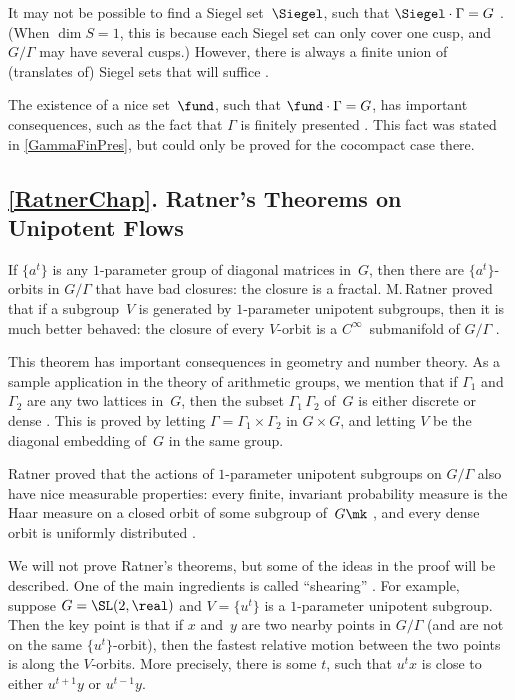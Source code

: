 It may not be possible to find a Siegel set~$\Siegel$, such that $\Siegel \cdot \Gamma = G$ . (When $\dim S = 1$, this is because each Siegel set can only cover one cusp, and $G/\Gamma$ may have several cusps.) However, there is always a finite union of (translates of) Siegel sets that will suffice .

\smallbreak

The existence of a nice set~$\fund$, such that $\fund \cdot \Gamma = G$, has  important consequences, such as the fact that $\Gamma$ is finitely presented . This fact was stated in \cref{GammaFinPres}, but could only be proved for the cocompact case there.






\subsection*{\cref{RatnerChap}. Ratner's Theorems on Unipotent Flows}
If $\{a^t\}$ is any $1$-parameter group of diagonal matrices in~$G$, then there are $\{a^t\}$-orbits in $G/\Gamma$ that have bad closures: the closure is a fractal. M.\,Ratner proved that if a subgroup~$V$ is generated by $1$-parameter unipotent subgroups, then it is much better behaved: the closure of every $V$-orbit is a $C^\infty$~submanifold of $G/\Gamma$ . 

\smallbreak

This theorem has important consequences in geometry and number theory. As a sample application in the theory of arithmetic groups, we mention that if $\Gamma_1$ and~$\Gamma_2$ are any two lattices in~$G$, then the subset $\Gamma_1 \, \Gamma_2$ of~$G$ is either discrete or dense . This is proved by letting $\Gamma = \Gamma_1 \times \Gamma_2$ in $G \times G$, and letting $V$ be the diagonal embedding of~$G$ in the same group.

\smallbreak

Ratner proved that the actions of $1$-parameter unipotent subgroups on $G/\Gamma$ also have nice measurable properties: every finite, invariant probability measure is the Haar measure on a closed orbit of some subgroup of~$G\mk$ , and every dense orbit is uniformly distributed .

\smallbreak

We will not prove Ratner's theorems, but some of the ideas in the proof will be described. One of the main ingredients is called ``shearing'' . For example, suppose $G = \SL(2,\real)$ and $V = \{u^t\}$ is a $1$-parameter unipotent subgroup. Then the key point is that if $x$ and~$y$ are two nearby points in $G/\Gamma$ (and are not on the same $\{u^t\}$-orbit), then the fastest relative motion between the two points is along the $V$-orbits. More precisely, there is some $t$, such that $u^t x$ is close to either $u^{t+1} y$ or $u^{t-1} y$.




